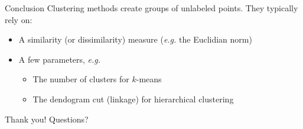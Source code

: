 \documentclass{beamer}
\begin{document}
\begin{frame}{Conclusion}
Clustering methods create groups of unlabeled points.
\vfill
\pause
They typically rely on:
\begin{itemize}
	\item A similarity (or dissimilarity) measure (\textit{e.g.} the Euclidian norm)
	\item A few parameters, \textit{e.g.}
	\begin{itemize}
		\item The number of clusters for $k$-means
		\item The dendogram cut (linkage) for hierarchical clustering
	\end{itemize}
\end{itemize}
\end{frame}

\begin{frame}
	\center
	\huge{Thank you! Questions?}
\end{frame}
\end{document}
